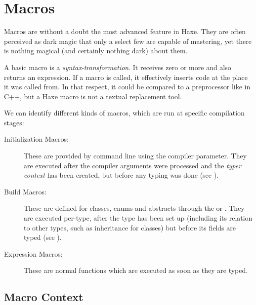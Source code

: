 \documentclass{haxe}
\begin{document}
\chapter{Macros}
\label{macro}

Macros are without a doubt the most advanced feature in Haxe. They are often perceived as dark magic that only a select few are capable of mastering, yet there is nothing magical (and certainly nothing dark) about them.


A basic macro is a \emph{syntax-transformation}. It receives zero or more  and also returns an expression. If a macro is called, it effectively inserts code at the place it was called from. In that respect, it could be compared to a preprocessor like  in C++, but a Haxe macro is not a textual replacement tool.

We can identify different kinds of macros, which are run at specific compilation stages:

\begin{description}
	\item[Initialization Macros:] These are provided by command line using the  compiler parameter. They are executed after the compiler arguments were processed and the \emph{typer context} has been created, but before any typing was done (see ).
	\item[Build Macros:] These are defined for classes, enums and abstracts through the  or  . They are executed per-type, after the type has been set up (including its relation to other types, such as inheritance for classes) but before its fields are typed (see ).
	\item[Expression Macros:] These are normal functions which are executed as soon as they are typed.
\end{description}
	
\section{Macro Context}
\label{macro-context}

\end{document}
